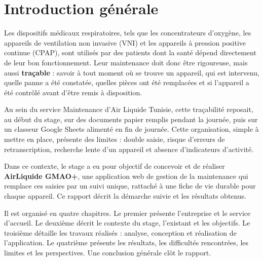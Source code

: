 \chapter*{Introduction générale}

Les dispositifs médicaux respiratoires, tels que les concentrateurs d'oxygène, les appareils de ventilation non invasive (VNI) et les appareils à pression positive continue (CPAP), sont utilisés par des patients dont la santé dépend directement de leur bon fonctionnement. Leur maintenance doit donc être rigoureuse, mais aussi \textbf{traçable} : savoir à tout moment où se trouve un appareil, qui est intervenu, quelle panne a été constatée, quelles pièces ont été remplacées et si l'appareil a été contrôlé avant d'être remis à disposition.

Au sein du service Maintenance d'Air Liquide Tunisie, cette traçabilité reposait, au début du stage, sur des documents papier remplis pendant la journée, puis sur un classeur Google Sheets alimenté en fin de journée. Cette organisation, simple à mettre en place, présente des limites : double saisie, risque d'erreurs de retranscription, recherche lente d'un appareil et absence d'indicateurs d'activité.

Dans ce contexte, le stage a eu pour objectif de concevoir et de réaliser \textbf{AirLiquide GMAO+}, une application web de gestion de la maintenance qui remplace ces saisies par un suivi unique, rattaché à une fiche de vie durable pour chaque appareil. Ce rapport décrit la démarche suivie et les résultats obtenus.

Il est organisé en quatre chapitres. Le premier présente l'entreprise et le service d'accueil. Le deuxième décrit le contexte du stage, l'existant et les objectifs. Le troisième détaille les travaux réalisés : analyse, conception et réalisation de l'application. Le quatrième présente les résultats, les difficultés rencontrées, les limites et les perspectives. Une conclusion générale clôt le rapport.

